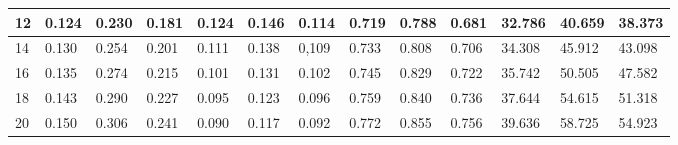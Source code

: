 \begin{table*}[]
\begin{tabular}{|l | lll| lll |lll |lll|}
		12 & 0.124   & 0.230   & 0.181  & 0.124    & 0.146    &  0.114   & 0.719     & 0.788    & 0.681    & 32.786     & 40.659     & 38.373     \\ \hline
		14 & 0.130   & 0.254   & 0.201  & 0.111    & 0.138    & 0,109   &  0.733     & 0.808    & 0.706    & 34.308     & 45.912     & 43.098     \\ \hline
		16 & 0.135   & 0.274   & 0.215  &  0.101    & 0.131    & 0.102   & 0.745    & 0.829    & 0.722    & 35.742     & 50.505     & 47.582     \\ \hline
		18 & 0.143   & 0.290   & 0.227  & 0.095   & 0.123    & 0.096   & 0.759     & 0.840    & 0.736    & 37.644     & 54.615     & 51.318     \\ \hline
		20 & 0.150   & 0.306   & 0.241  & 0.090    & 0.117    & 0.092   & 0.772     & 0.855    & 0.756    & 39.636    & 58.725     & 54.923    \\ \hline
	\end{tabular}
	\vspace{.2cm}
	\label{tab:combined_dt20}
\end{table*}